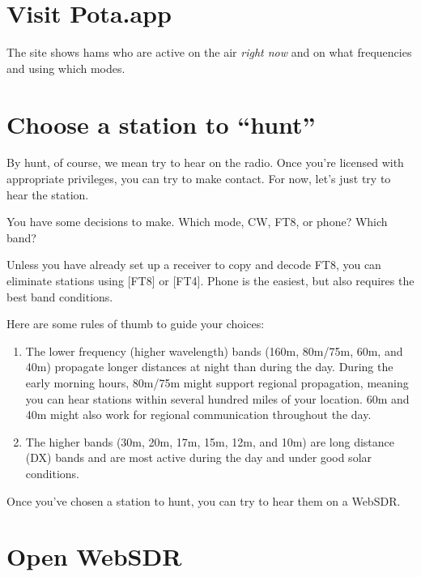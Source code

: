 \documentclass[
  letterpaper,
  DIV=11,
  numbers=noendperiod]{scrreport}
\begin{document}
\hypertarget{visit-pota.app}{%
\section*{Visit Pota.app}\label{visit-pota.app}}


The site shows hams who are active on the air \emph{right now} and on
what frequencies and using which modes.

\hypertarget{choose-a-station-to-hunt}{%
\section*{Choose a station to ``hunt''}\label{choose-a-station-to-hunt}}


By hunt, of course, we mean try to hear on the radio. Once you're
licensed with appropriate privileges, you can try to make contact. For
now, let's just try to hear the station.

You have some decisions to make. Which mode, CW, FT8, or phone? Which
band?

Unless you have already set up a receiver to copy and decode FT8, you
can eliminate stations using {[}FT8{]} or {[}FT4{]}. Phone is the
easiest, but also requires the best band conditions.

Here are some rules of thumb to guide your choices:

\begin{enumerate}
\def\labelenumi{\arabic{enumi}.}
\item
  The lower frequency (higher wavelength) bands (160m, 80m/75m, 60m, and
  40m) propagate longer distances at night than during the day. During
  the early morning hours, 80m/75m might support regional propagation,
  meaning you can hear stations within several hundred miles of your
  location. 60m and 40m might also work for regional communication
  throughout the day.
\item
  The higher bands (30m, 20m, 17m, 15m, 12m, and 10m) are long distance
  (DX) bands and are most active during the day and under good solar
  conditions.
\end{enumerate}

Once you've chosen a station to hunt, you can try to hear them on a
WebSDR.

\hypertarget{open-websdr}{%
\section*{Open WebSDR}\label{open-websdr}}
\end{document}
